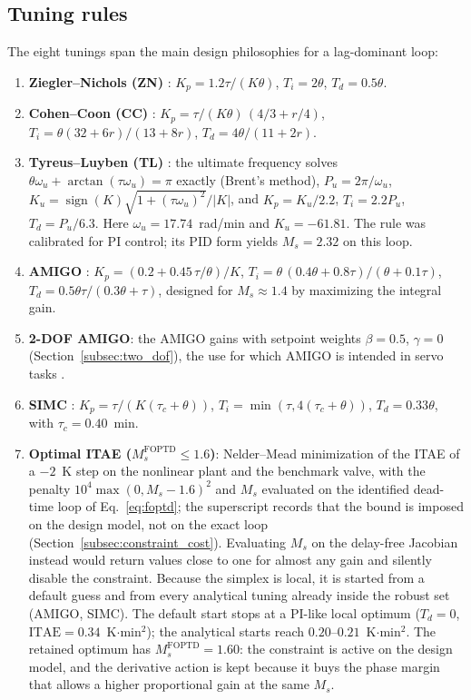 \subsection{Tuning rules}
\label{subsec:tuning_rules}
The eight tunings span the main design philosophies for a lag-dominant loop:
\begin{enumerate}
    \item \textbf{Ziegler--Nichols (ZN)} \cite{ziegler1942optimum}: $K_p = 1.2\tau/(K\theta)$, $T_i = 2\theta$, $T_d = 0.5\theta$.
    \item \textbf{Cohen--Coon (CC)} \cite{cohen1953theoretical}: $K_p = \tau/(K\theta)\,(4/3 + r/4)$, $T_i = \theta(32 + 6r)/(13 + 8r)$, $T_d = 4\theta/(11 + 2r)$.
    \item \textbf{Tyreus--Luyben (TL)} \cite{tyreus1992tuning, luyben2007chemical}: the ultimate frequency solves $\theta\omega_u + \arctan(\tau\omega_u) = \pi$ exactly (Brent's method), $P_u = 2\pi/\omega_u$, $K_u = \operatorname{sign}(K)\sqrt{1 + (\tau\omega_u)^2}/|K|$, and $K_p = K_u/2.2$, $T_i = 2.2P_u$, $T_d = P_u/6.3$. Here $\omega_u = 17.74$~rad/min and $K_u = -61.81$. The rule was calibrated for PI control; its PID form yields $M_s = 2.32$ on this loop.
    \item \textbf{AMIGO} \cite{astrom2004revisiting, astrom2006pid}: $K_p = (0.2 + 0.45\,\tau/\theta)/K$, $T_i = \theta\,(0.4\theta + 0.8\tau)/(\theta + 0.1\tau)$, $T_d = 0.5\theta\tau/(0.3\theta + \tau)$, designed for $M_s \approx 1.4$ by maximizing the integral gain.
    \item \textbf{2-DOF AMIGO}: the AMIGO gains with setpoint weights $\beta = 0.5$, $\gamma = 0$ (Section~\ref{subsec:two_dof}), the use for which AMIGO is intended in servo tasks \cite{astrom2004revisiting}.
    \item \textbf{SIMC} \cite{skogestad2003simple, grimholt2018optimal}: $K_p = \tau/(K(\tau_c + \theta))$, $T_i = \min(\tau, 4(\tau_c + \theta))$, $T_d = 0.33\theta$, with $\tau_c = 0.40$~min.
    \item \textbf{Optimal ITAE ($M_s^{\mathrm{FOPTD}} \le 1.6$)}: Nelder--Mead minimization of the ITAE of a $-2$~K step on the nonlinear plant and the benchmark valve, with the penalty $10^4\max(0, M_s - 1.6)^2$ and $M_s$ evaluated on the identified dead-time loop of Eq.~\eqref{eq:foptd}; the superscript records that the bound is imposed on the design model, not on the exact loop (Section~\ref{subsec:constraint_cost}). Evaluating $M_s$ on the delay-free Jacobian instead would return values close to one for almost any gain and silently disable the constraint. Because the simplex is local, it is started from a default guess and from every analytical tuning already inside the robust set (AMIGO, SIMC). The default start stops at a PI-like local optimum ($T_d = 0$, $\mathrm{ITAE} = 0.34$~K$\cdot$min$^2$); the analytical starts reach $0.20$--$0.21$~K$\cdot$min$^2$. The retained optimum has $M_s^{\mathrm{FOPTD}} = 1.60$: the constraint is active on the design model, and the derivative action is kept because it buys the phase margin that allows a higher proportional gain at the same $M_s$.

\end{enumerate}
